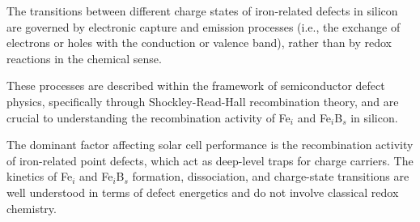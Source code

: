 \documentclass[a4paper,fleqn]{cas-sc}
\begin{document}
The transitions between different charge states of iron-related defects in silicon are governed by electronic capture and emission processes (i.e., the exchange of electrons or holes with the conduction or valence band), rather than by redox reactions in the chemical sense.


These processes are described within the framework of semiconductor defect physics, specifically through Shockley-Read-Hall recombination theory, and are crucial to understanding the recombination activity of Fe$_i$ and Fe$_i$B$_s$ in silicon.


The dominant factor affecting solar cell performance is the recombination activity of iron-related point defects, which act as deep-level traps for charge carriers.
The kinetics of Fe$_i$ and Fe$_i$B$_s$ formation, dissociation, and charge-state transitions are well understood in terms of defect energetics and do not involve classical redox chemistry.
\end{document}
